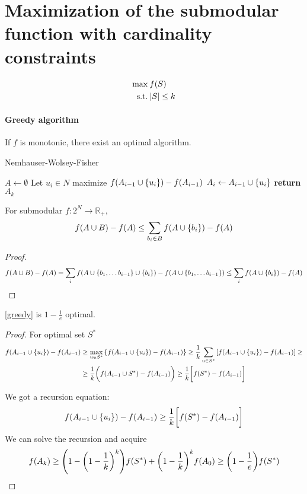 \section{Maximization of the submodular function with cardinality constraints}
\begin{align}
\max \: & f(S)\\
\text{s.t.} \: & \abs{S} \leq k
\end{align}

\paragraph{Greedy algorithm}
If $f$ is monotonic, there exist an optimal algorithm.
\begin{algorithm}
	\caption{Nemhauser-Wolsey-Fisher}\label{greedy}
	\begin{algorithmic}[1]
		\State $A \gets \emptyset$
		\State Let $u_i\in N$ maximize $f(A_{i-1} \cup \qty{u_i}) - f(A_{i-1})$
		\State $ A_i \gets A_{i-1} \cup \qty{u_i}$
		\EndFor
		\State \textbf{return} $A_k$
		\EndProcedure
	\end{algorithmic}
\end{algorithm}
\begin{lemma}
	For submodular $f: 2^N \to \mathbb{R}_+$,
	\begin{align}
	f(A\cup B) - f(A) \leq \sum_{b_i \in B} f(A\cup \qty{b_i}) - f(A)
	\end{align}
	\begin{proof}
		\begin{align}
		f(A\cup B) - f(A) = \sum_i f(A \cup \qty{b_1, \dots b_{i-1}} \cup \qty{b_i} ) - f(A \cup \qty{b_1, \dots b_{i-1}})\leq \sum_i f(A \cup \qty{b_i}) - f(A)
		\end{align}
	\end{proof}
\end{lemma}
\begin{prop} \label{greedy_proof}
	\cref{greedy} is $1-\frac{1}{e}$ optimal.
	\begin{proof}
		For optimal set $S^*$
		\begin{align}
		f(A_{i-1} \cup \qty{u_i}) - f(A_{i-1})&\geq \max\limits_{u\in S^*} \qty{f(A_{i-1} \cup \qty{u_i}) - f(A_{i-1})} \geq \frac{1}{k} \sum_{u\in S^*} \qty[f(A_{i-1} \cup \qty{u_i}) - f(A_{i-1})] \geq\\&\geq \frac{1}{k} \qty\bigg(f(A_{i-1} \cup S^*) - f(A_{i-1})) \geq \frac{1}{k} \qty\bigg[f(S^*) - f(A_{i-1})]
		\end{align}
		
		We got a recursion equation:
		\begin{align}
		f(A_{i-1} \cup \qty{u_i}) - f(A_{i-1})\geq \frac{1}{k} \qty\bigg[f(S^*) - f(A_{i-1})]
		\end{align}
		We can solve the recursion and acquire
		\begin{align}
		f(A_{k}) \geq \qty(1-\qty(1-\frac{1}{k})^k)f(S^*) + \qty(1-\frac{1}{k})^k f(A_0) \geq \qty(1-\frac{1}{e}) f(S^*) 
		\end{align}
		
	\end{proof}
\end{prop}

